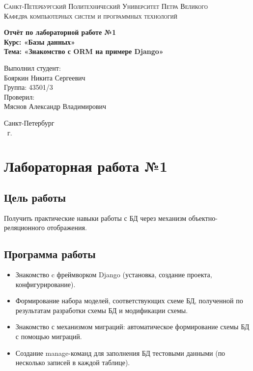 \documentclass[14pt,a4paper,report]{report}
\begin{document}
\def\contentsname{Содержание}

\begin{titlepage}
	\begin{center}
		\textsc{Санкт-Петербургский Политехнический 
			Университет Петра Великого\\[5mm]
			Кафедра компьютерных систем и программных технологий}
		
		\vfill
		
		\textbf{Отчёт по лабораторной работе №1\\[3mm]
			Курс: «Базы данных»\\[3mm]
			Тема: «Знакомство с ORM на примере Django»\\[35mm]
			}
	\end{center}
	
	\hfill
	\begin{minipage}{.5\textwidth}
		Выполнил студент:\\[2mm] 
		Бояркин Никита Сергеевич\\
		Группа: 43501/3\\[5mm]
		
		Проверил:\\[2mm] 
		Мяснов Александр Владимирович
	\end{minipage}
	\vfill
	\begin{center}
		Санкт-Петербург\\ \the\year\ г.
	\end{center}
\end{titlepage}

\tableofcontents
\clearpage

\chapter{Лабораторная работа №1}

\section{Цель работы}

Получить практические навыки работы с БД через механизм объектно-реляционного отображения.

\section{Программа работы}

\begin{itemize}
	\item Знакомство c фреймворком Django (установка, создание проекта, конфигурирование).
	\item Формирование набора моделей, соответствующих схеме БД, полученной по результатам разработки схемы БД и модификации схемы.
	\item Знакомство с механизмом миграций: автоматическое формирование схемы БД с помощью миграций.
	\item Создание manage-команд для заполнения БД тестовыми данными (по несколько записей в каждой таблице).
\end{itemize}
\end{document}
